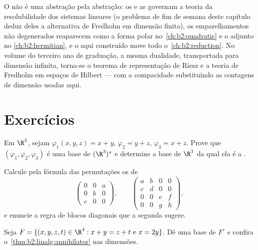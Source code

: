 \begin{remark}
O  não é uma abstração pela abstração: os 
e as  governam a teoria da resolubilidade dos sistemas lineares (o
problema de fim de semana deste capítulo deduz deles a alternativa de Fredholm
em dimensão finita), os emparelhamentos não degenerados reaparecem como a
forma polar no~\cref{ch:b2:quadratic} e o adjunto no
\cref{ch:b2:hermitian}, e o  aqui construído move
todo o~\cref{ch:b2:reduction}. No volume do terceiro ano de graduação, a mesma
dualidade, transportada para dimensão infinita, torna-se o
teorema de representação de Riesz e a teoria de Fredholm em espaços de
Hilbert --- com a compacidade substituindo as contagens de dimensão usadas
aqui.
\end{remark}

\section{Exercícios}

\begin{exercise}[$\star$]\label{exo:b2:linalg:1}
Em $\R^3$, sejam $\varphi_1(x,y,z) = x + y$, $\varphi_2 = y + z$,
$\varphi_3 = x + z$. Prove que $(\varphi_1, \varphi_2, \varphi_3)$
é uma base de $(\R^3)^*$ e determine a base de $\R^3$ da qual ela é a
.
\end{exercise}

\begin{exercise}[$\star$]\label{exo:b2:linalg:2}
Calcule pela fórmula das permutações os  de
\[
\begin{pmatrix} 0 & 0 & a\\ 0 & b & 0\\ c & 0 & 0 \end{pmatrix},
\qquad
\begin{pmatrix}
a & b & 0 & 0\\
c & d & 0 & 0\\
0 & 0 & e & f\\
0 & 0 & g & h
\end{pmatrix},
\]
e enuncie a regra de blocos diagonais que a segunda sugere.
\end{exercise}

\begin{exercise}[$\star$]\label{exo:b2:linalg:3}
Seja $F = \{(x,y,z,t) \in \R^4 : x + y = z + t \text{ e } x = 2y\}$.
Dê uma base de $F^\circ$ e confira
o~\cref{thm:b2:linalg:annihilator} nas dimensões.
\end{exercise}

